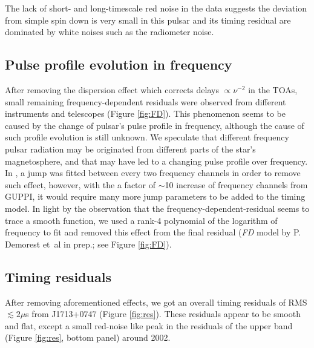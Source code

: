 The lack of short- and long-timescale red noise in the data suggests the deviation from simple spin down is very small in this pulsar and its timing residual are dominated by white noises such as the radiometer noise.




\subsection{Pulse profile evolution in frequency}
\label{sec:FD}
After removing the dispersion effect which corrects delays $\propto \nu^{-2}$
in the TOAs, small remaining frequency-dependent residuals were observed from
different instruments and telescopes (Figure \ref{fig:FD}).  
This phenomenon seems to be caused by the change of pulsar's pulse profile in
frequency, although the cause of such profile evolution is still unknown.
We speculate that different frequency pulsar radiation may be originated from
different parts of the star's magnetosphere, and that may have led to a
changing pulse profile over frequency.
In \citet{sns+05}, a jump was fitted between every two frequency channels in
order to remove such effect, however, with the a factor of $\sim$10 increase
of frequency channels from GUPPI, it would require many more jump parameters
to be added to the timing model.
In light by the observation that the frequency-dependent-residual seems to
trace a smooth function, we used a rank-4 polynomial of the logarithm of
frequency to fit and removed this effect from the final residual ({\it FD}
model by P. Demorest et~al in prep.; see Figure \ref{fig:FD}). 



\subsection{Timing residuals}
\label{sec:res}

After removing aforementioned effects, we got an overall timing residuals of RMS $\lesssim 2\mu$s from J1713+0747 (Figure \ref{fig:res}).
These residuals appear to be smooth and flat, except a small red-noise like
peak in the residuals of the upper band (Figure \ref{fig:res}, bottom panel) around 2002. 

